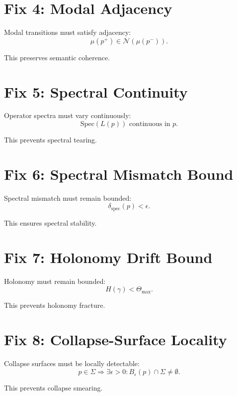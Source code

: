 \documentclass[11pt]{article}
\begin{document}
\section{Fix 4: Modal Adjacency}

Modal transitions must satisfy adjacency:
\[
\mu(p^+) \in \mathcal{N}(\mu(p^-)).
\]

This preserves semantic coherence.

\section{Fix 5: Spectral Continuity}

Operator spectra must vary continuously:
\[
\mathrm{Spec}(L(p)) \text{ continuous in } p.
\]

This prevents spectral tearing.

\section{Fix 6: Spectral Mismatch Bound}

Spectral mismatch must remain bounded:
\[
\delta_{\mathrm{spec}}(p) < \epsilon.
\]

This ensures spectral stability.

\section{Fix 7: Holonomy Drift Bound}

Holonomy must remain bounded:
\[
H(\gamma) < \Theta_{\max}.
\]

This prevents holonomy fracture.

\section{Fix 8: Collapse-Surface Locality}

Collapse surfaces must be locally detectable:
\[
p \in \Sigma \Rightarrow \exists \epsilon > 0 : B_\epsilon(p) \cap \Sigma \neq \emptyset.
\]

This prevents collapse smearing.

\end{document}

